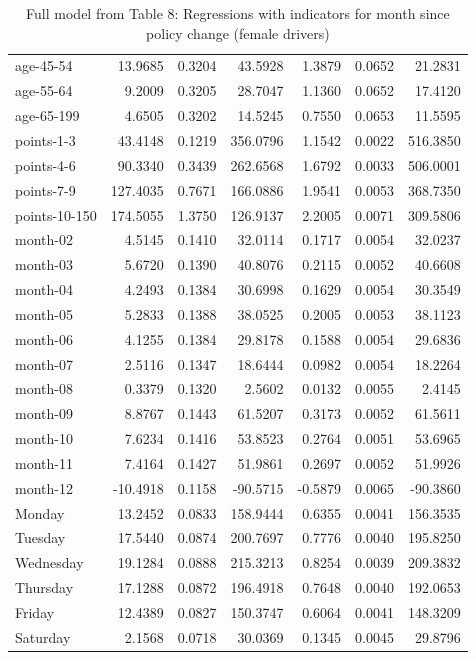 \documentclass[10pt]{article}
\begin{document}
\begin{table}[ht]
\begin{tabular}{lrrrrrr}
  age-45-54 & 13.9685 & 0.3204 & 43.5928 & 1.3879 & 0.0652 & 21.2831 \\ 
  age-55-64 & 9.2009 & 0.3205 & 28.7047 & 1.1360 & 0.0652 & 17.4120 \\ 
  age-65-199 & 4.6505 & 0.3202 & 14.5245 & 0.7550 & 0.0653 & 11.5595 \\ 
  points-1-3 & 43.4148 & 0.1219 & 356.0796 & 1.1542 & 0.0022 & 516.3850 \\ 
  points-4-6 & 90.3340 & 0.3439 & 262.6568 & 1.6792 & 0.0033 & 506.0001 \\ 
  points-7-9 & 127.4035 & 0.7671 & 166.0886 & 1.9541 & 0.0053 & 368.7350 \\ 
  points-10-150 & 174.5055 & 1.3750 & 126.9137 & 2.2005 & 0.0071 & 309.5806 \\ 
  month-02 & 4.5145 & 0.1410 & 32.0114 & 0.1717 & 0.0054 & 32.0237 \\ 
  month-03 & 5.6720 & 0.1390 & 40.8076 & 0.2115 & 0.0052 & 40.6608 \\ 
  month-04 & 4.2493 & 0.1384 & 30.6998 & 0.1629 & 0.0054 & 30.3549 \\ 
  month-05 & 5.2833 & 0.1388 & 38.0525 & 0.2005 & 0.0053 & 38.1123 \\ 
  month-06 & 4.1255 & 0.1384 & 29.8178 & 0.1588 & 0.0054 & 29.6836 \\ 
  month-07 & 2.5116 & 0.1347 & 18.6444 & 0.0982 & 0.0054 & 18.2264 \\ 
  month-08 & 0.3379 & 0.1320 & 2.5602 & 0.0132 & 0.0055 & 2.4145 \\ 
  month-09 & 8.8767 & 0.1443 & 61.5207 & 0.3173 & 0.0052 & 61.5611 \\ 
  month-10 & 7.6234 & 0.1416 & 53.8523 & 0.2764 & 0.0051 & 53.6965 \\ 
  month-11 & 7.4164 & 0.1427 & 51.9861 & 0.2697 & 0.0052 & 51.9926 \\ 
  month-12 & -10.4918 & 0.1158 & -90.5715 & -0.5879 & 0.0065 & -90.3860 \\ 
  Monday & 13.2452 & 0.0833 & 158.9444 & 0.6355 & 0.0041 & 156.3535 \\ 
  Tuesday & 17.5440 & 0.0874 & 200.7697 & 0.7776 & 0.0040 & 195.8250 \\ 
  Wednesday & 19.1284 & 0.0888 & 215.3213 & 0.8254 & 0.0039 & 209.3832 \\ 
  Thursday & 17.1288 & 0.0872 & 196.4918 & 0.7648 & 0.0040 & 192.0653 \\ 
  Friday & 12.4389 & 0.0827 & 150.3747 & 0.6064 & 0.0041 & 148.3209 \\ 
  Saturday & 2.1568 & 0.0718 & 30.0369 & 0.1345 & 0.0045 & 29.8796 \\ 
   \hline
\end{tabular}
\caption{Full model from Table 8: Regressions with indicators for month since policy change (female drivers)} 
\label{tab_8_all_pts_no_age_F}
\end{table}


\clearpage
\pagebreak




% 

% 



\end{document}
